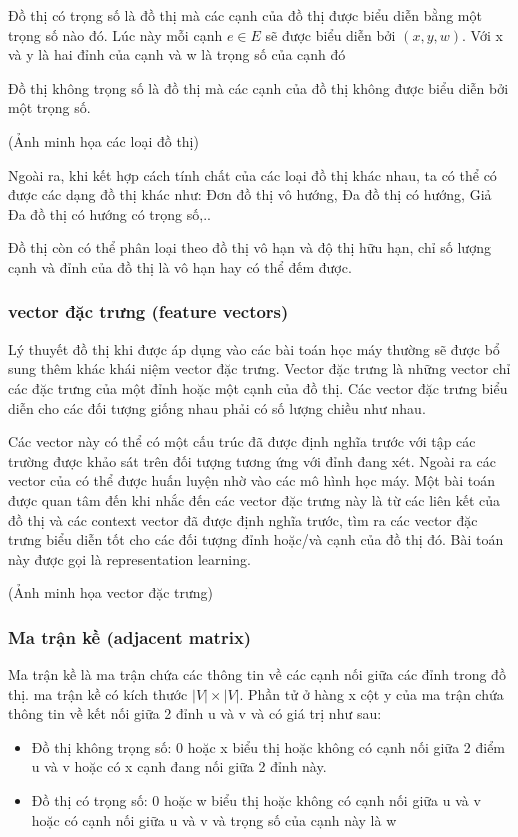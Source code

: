 Đồ thị có trọng số là đồ thị mà các cạnh của đồ thị được biểu diễn bằng một trọng số nào đó. Lúc này mỗi cạnh $e \in E$ sẽ được biểu diễn bởi $(x, y, w)$. Với x và y là hai đỉnh của cạnh và w là trọng số của cạnh đó

Đồ thị không trọng số là đồ thị mà các cạnh của đồ thị không được biểu diễn bởi một trọng số.

(Ảnh minh họa các loại đồ thị)

Ngoài ra, khi kết hợp cách tính chất của các loại đồ thị khác nhau, ta có thể có được các dạng đồ thị khác như: Đơn đồ thị vô hướng, Đa đồ thị có hướng, Giả Đa đồ thị có hướng có trọng số,..

Đồ thị còn có thể phân loại theo đồ thị vô hạn và độ thị hữu hạn, chỉ số lượng cạnh và đỉnh của đồ thị là vô hạn hay có thể đếm được.

\subsubsection{vector đặc trưng (feature vectors)}

Lý thuyết đồ thị khi được áp dụng vào các bài toán học máy thường sẽ được bổ sung thêm khác khái niệm vector đặc trưng. Vector đặc trưng là những vector chỉ các đặc trưng của một đỉnh hoặc một cạnh của đồ thị. Các vector đặc trưng biểu diễn cho các đối tượng giống nhau phải có số lượng chiều như nhau.

Các vector này có thể có một cấu trúc đã được định nghĩa trước với tập các trường được khảo sát trên đối tượng tương ứng với đỉnh đang xét. Ngoài ra các vector của có thể được huấn luyện nhờ vào các mô hình học máy. Một bài toán được quan tâm đến khi nhắc đến các vector đặc trưng này là từ các liên kết của đồ thị và các context vector đã được định nghĩa trước, tìm ra các vector đặc trưng biểu diễn tốt cho các đối tượng đỉnh hoặc/và cạnh của đồ thị đó. Bài toán này được gọi là representation learning.

(Ảnh minh họa vector đặc trưng)

\subsubsection{Ma trận kề (adjacent matrix)}

Ma trận kề là ma trận chứa các thông tin về các cạnh nối giữa các đỉnh trong đồ thị. ma trận kề có kích thước $|V| \times |V|$. Phần tử ở hàng x cột y của ma trận chứa thông tin về kết nối giữa 2 đỉnh u và v và có giá trị như sau:
\begin{itemize}
	\item Đồ thị không trọng số: 0 hoặc x biểu thị hoặc không có cạnh nối giữa 2 điểm u và v hoặc có x cạnh đang nối giữa 2 đỉnh này.
	\item Đồ thị có trọng số: 0 hoặc w biểu thị hoặc không có cạnh nối giữa u và v hoặc có cạnh nối giữa u và v và trọng số của cạnh này là w
\end{itemize}

